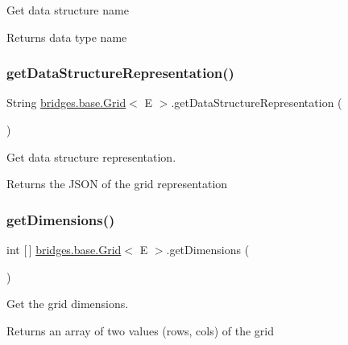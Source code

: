 Get data structure name \begin{DoxyReturn}{Returns}
data type name 
\end{DoxyReturn}
\mbox{\label{classbridges_1_1base_1_1_grid_a9a7faf2bbabae8d2f2babe9e29deb2c8}} 
\subsubsection{\texorpdfstring{get\+Data\+Structure\+Representation()}{getDataStructureRepresentation()}}
{\footnotesize\ttfamily String \hyperlink{classbridges_1_1base_1_1_grid}{bridges.\+base.\+Grid}$<$ E $>$.get\+Data\+Structure\+Representation (\begin{DoxyParamCaption}{ }\end{DoxyParamCaption})}



Get data structure representation. 

\begin{DoxyReturn}{Returns}
the J\+S\+ON of the grid representation 
\end{DoxyReturn}
\mbox{\label{classbridges_1_1base_1_1_grid_aee8a5b66095d65ff067a4e76f2611b0e}} 
\subsubsection{\texorpdfstring{get\+Dimensions()}{getDimensions()}}
{\footnotesize\ttfamily int \mbox{[}$\,$\mbox{]} \hyperlink{classbridges_1_1base_1_1_grid}{bridges.\+base.\+Grid}$<$ E $>$.get\+Dimensions (\begin{DoxyParamCaption}{ }\end{DoxyParamCaption})}



Get the grid dimensions. 

\begin{DoxyReturn}{Returns}
an array of two values (rows, cols) of the grid 
\end{DoxyReturn}
\mbox{\label{classbridges_1_1base_1_1_grid_ab79ceb737423bb28ea2348e61a625a17}} 
